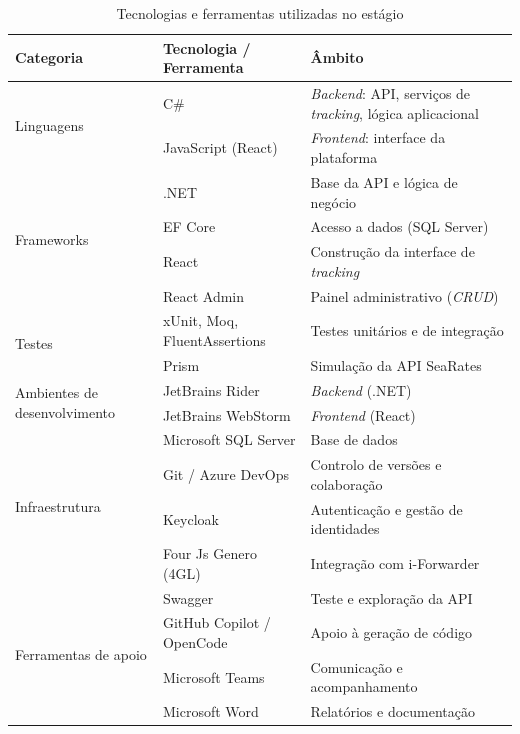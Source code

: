 \documentclass[a4paper,12pt]{report}
\begin{document}
\begin{table}[H]
\centering
\caption{Tecnologias e ferramentas utilizadas no estágio}
\label{tab:tecnologias}
\small
\begin{tabular}{@{}p{} p{} p{}@{}}
\toprule
\textbf{Categoria} & \textbf{Tecnologia / Ferramenta} & \textbf{Âmbito} \\
\midrule
\multirow{2}{=}{Linguagens}
  & C\# & \textit{Backend}: API, serviços de \textit{tracking}, lógica aplicacional \\
  & JavaScript (React) & \textit{Frontend}: interface da plataforma \\
\midrule
\multirow{4}{=}{Frameworks}
  & .NET \cite{dotnet} & Base da API e lógica de negócio \\
  & EF Core \cite{efcore} & Acesso a dados (SQL Server) \\
  & React \cite{react} & Construção da interface de \textit{tracking} \\
  & React Admin \cite{reactadmin} & Painel administrativo (\textit{CRUD}) \\
\midrule
\multirow{2}{=}{Testes}
  & xUnit, Moq, FluentAssertions \cite{xunit,moq,fluentassertions} & Testes unitários e de integração \\
  & Prism \cite{prism} & Simulação da API SeaRates \\
\midrule
\multirow{2}{=}{Ambientes de desenvolvimento}
  & JetBrains Rider \cite{rider} & \textit{Backend} (.NET) \\
  & JetBrains WebStorm \cite{webstorm} & \textit{Frontend} (React) \\
\midrule
\multirow{4}{=}{Infraestrutura}
  & Microsoft SQL Server \cite{sqlserver} & Base de dados \\
  & Git / Azure DevOps \cite{azuredevops} & Controlo de versões e colaboração \\
  & Keycloak \cite{keycloak} & Autenticação e gestão de identidades \\
  & Four Js Genero (4GL) \cite{fourjs} & Integração com i-Forwarder \\
\midrule
\multirow{4}{=}{Ferramentas de apoio}
  & Swagger \cite{swagger} & Teste e exploração da API \\
  & GitHub Copilot \cite{copilot} / OpenCode & Apoio à geração de código \\
  & Microsoft Teams & Comunicação e acompanhamento \\
  & Microsoft Word & Relatórios e documentação \\
\bottomrule
\end{tabular}
\end{table}
\end{document}
